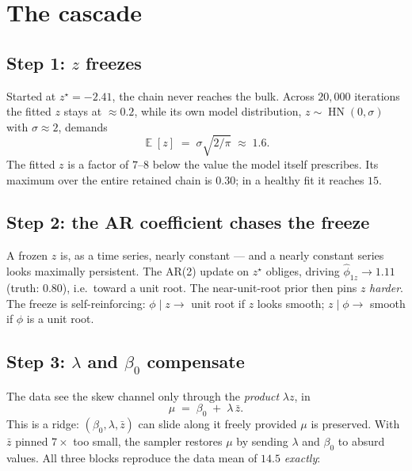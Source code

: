 \documentclass[11pt]{article}
\DeclareMathOperator{\hn}{HN}
\DeclareMathOperator{\E}{\mathbb{E}}
\begin{document}
\section{The cascade}

\subsection{Step 1: $z$ freezes}

Started at $z^\star = -2.41$, the chain never reaches the bulk. Across $20{,}000$
iterations the fitted $z$ stays at $\approx 0.2$, while its own model
distribution, $z \sim \hn(0,\sigma)$ with $\sigma \approx 2$, demands
\begin{equation}
  \E[z] \;=\; \sigma\sqrt{2/\pi} \;\approx\; 1.6 .
  \label{eq:zmean}
\end{equation}
The fitted $z$ is a factor of $7$--$8$ below the value the model itself
prescribes. Its maximum over the entire retained chain is $0.30$; in a healthy
fit it reaches $15$.

\subsection{Step 2: the AR coefficient chases the freeze}

A frozen $z$ is, as a time series, nearly constant --- and a nearly constant
series looks maximally persistent. The AR(2) update on $z^\star$ obliges,
driving $\hat\phi_{1z} \to 1.11$ (truth: $0.80$), i.e.\ toward a unit root. The
near-unit-root prior then pins $z$ \emph{harder}. The freeze is
self-reinforcing: $\phi \mid z \to$ unit root if $z$ looks smooth; $z \mid \phi
\to$ smooth if $\phi$ is a unit root.

\subsection{Step 3: $\lambda$ and $\beta_0$ compensate}

The data see the skew channel only through the \emph{product} $\lambda z$, in
\begin{equation}
  \mu \;=\; \beta_0 \;+\; \lambda\,\bar z .
  \label{eq:ridge}
\end{equation}
This is a ridge: $(\beta_0, \lambda, \bar z)$ can slide along it freely provided
$\mu$ is preserved. With $\bar z$ pinned $7\times$ too small, the sampler
restores $\mu$ by sending $\lambda$ and $\beta_0$ to absurd values. All three
blocks reproduce the data mean of $14.5$ \emph{exactly}:
\end{document}
